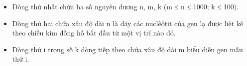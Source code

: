 \begin{itemize}
	\item Dòng thứ nhất chứa ba số nguyên dương n, m, k (m ≤ n ≤ 1000; k ≤ 100).
	\item Dòng thứ hai chứa xâu độ dài n là dãy các nuclêôtit của gen lạ được liệt kê theo chiều kim đồng hồ bắt đầu từ một vị trí nào đó.
	\item Dòng thứ i trong số k dòng tiếp theo chứa xâu độ dài m biểu diễn gen mẫu thứ i.
\end{itemize}
